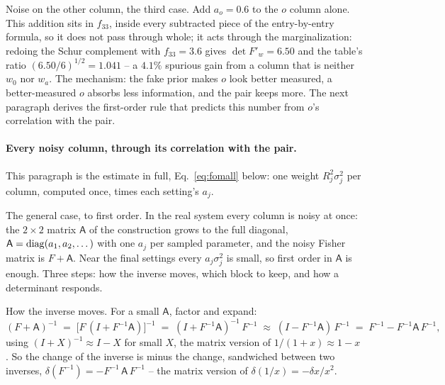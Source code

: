 \documentclass[11pt]{article}
\begin{document}
Noise on the other column, the third case.  Add $a_o = 0.6$ to the
$o$ column alone.  This addition sits in $f_{33}$, inside every
subtracted piece of the entry-by-entry formula, so it does not pass
through whole; it acts through the marginalization: redoing the Schur
complement with $f_{33} = 3.6$ gives $\det F'_w = 6.50$ and the
table's ratio $(6.50/6)^{1/2} = 1.041$ -- a $4.1\%$ spurious gain
from a column that is neither $w_0$ nor $w_a$.  The mechanism: the
fake prior makes $o$ look better measured, a better-measured $o$
absorbs less information, and the pair keeps more.  The next paragraph
derives the first-order rule that predicts this number from $o$'s
correlation with the pair.

\paragraph{Every noisy column, through its correlation with the pair.}
This paragraph is the estimate in full, Eq.~\eqref{eq:fomall}
below: one weight $R_j^2\sigma_j^2$ per column, computed once, times
each setting's $a_j$.

The general case, to first order.  In the real system every column is
noisy at once: the $2 \times 2$ matrix $\mathsf{A}$ of the
construction grows to the full diagonal,
$\mathsf{A} = {\rm diag}(a_1, a_2, \dots)$ with one $a_j$ per sampled
parameter, and the noisy Fisher matrix is $F + \mathsf{A}$.  Near the
final settings every $a_j\sigma_j^2$ is small, so first order in
$\mathsf{A}$ is enough.  Three steps: how the inverse moves, which
block to keep, and how a determinant responds.

How the inverse moves.  For a small $\mathsf{A}$, factor and expand:
\begin{equation*}
  (F + \mathsf{A})^{-1}
  \;=\; \bigl[F\,(I + F^{-1}\mathsf{A})\bigr]^{-1}
  \;=\; (I + F^{-1}\mathsf{A})^{-1}\,F^{-1}
  \;\approx\; (I - F^{-1}\mathsf{A})\,F^{-1}
  \;=\; F^{-1} - F^{-1}\mathsf{A}\,F^{-1} ,
\end{equation*}
using $(I + X)^{-1} \approx I - X$ for small $X$, the matrix version
of $1/(1 + x) \approx 1 - x$.  So the change of the inverse is minus
the change, sandwiched between two inverses,
$\delta(F^{-1}) = -F^{-1}\,\mathsf{A}\,F^{-1}$ -- the matrix version
of $\delta(1/x) = -\delta x/x^2$.
\end{document}

